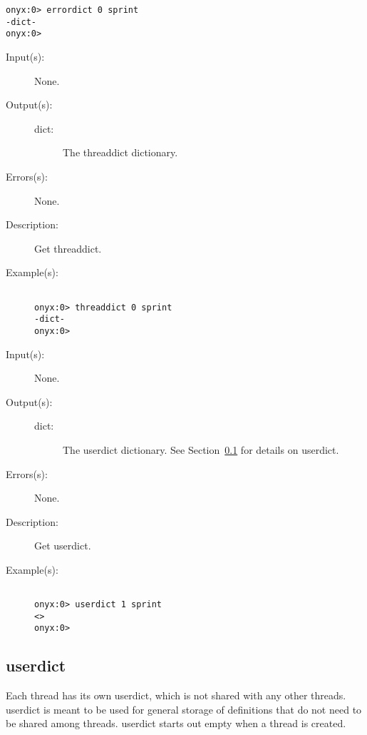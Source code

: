 \begin{description}
\begin{description}
\begin{verbatim}
onyx:0> errordict 0 sprint
-dict-
onyx:0>
		\end{verbatim}
	\end{description}
\label{threaddict:threaddict}
\item[{\onyxop{--}{threaddict}{dict}}: ]
	\begin{description}\item[]
	\item[Input(s): ] None.
	\item[Output(s): ]
		\begin{description}\item[]
		\item[dict: ]
			The threaddict dictionary.
		\end{description}
	\item[Errors(s): ] None.
	\item[Description: ]
		Get threaddict.
	\item[Example(s): ]\begin{verbatim}

onyx:0> threaddict 0 sprint
-dict-
onyx:0>
		\end{verbatim}
	\end{description}
\label{threaddict:userdict}
\item[{\onyxop{--}{userdict}{dict}}: ]
	\begin{description}\item[]
	\item[Input(s): ] None.
	\item[Output(s): ]
		\begin{description}\item[]
		\item[dict: ]
			The userdict dictionary.  See
			Section~\ref{sec:userdict} for details on userdict.
		\end{description}
	\item[Errors(s): ] None.
	\item[Description: ]
		Get userdict.
	\item[Example(s): ]\begin{verbatim}

onyx:0> userdict 1 sprint
<>
onyx:0>
		\end{verbatim}
	\end{description}
\end{description}

\subsection{userdict}
\label{sec:userdict}

Each thread has its own userdict, which is not shared with any other threads.
userdict is meant to be used for general storage of definitions that do not need
to be shared among threads.  userdict starts out empty when a thread is
created.
